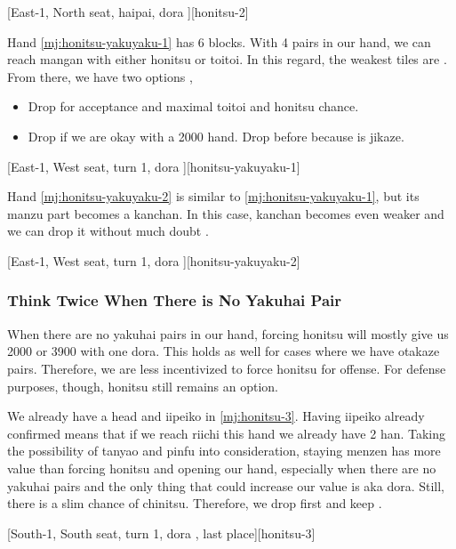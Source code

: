 \documentclass[12pt]{article}
\begin{document}
[East-1, North seat, haipai, dora ][honitsu-2]

Hand \ref{mj:honitsu-yakuyaku-1} has 6 blocks. With 4 pairs in our hand, we can reach mangan with either honitsu or toitoi. In this regard, the weakest tiles are . From there, we have two options \citep[][pp.~98--103]{tetsusenryaku},

\begin{itemize}
\item Drop  for  acceptance and maximal toitoi and honitsu chance.
\item Drop  if we are okay with a 2000 hand. Drop  before  because  is jikaze.
\end{itemize}

[East-1, West seat, turn 1, dora ][honitsu-yakuyaku-1]

Hand \ref{mj:honitsu-yakuyaku-2} is similar to \ref{mj:honitsu-yakuyaku-1}, but its manzu part becomes a kanchan. In this case,  kanchan becomes even weaker and we can drop it without much doubt \citep[][pp.~98--103]{tetsusenryaku}.

[East-1, West seat, turn 1, dora ][honitsu-yakuyaku-2]


\subsubsection*{Think Twice When There is No Yakuhai Pair}

When there are no yakuhai pairs in our hand, forcing honitsu will mostly give us 2000 or 3900 with one dora. This holds as well for cases where we have otakaze pairs. Therefore, we are less incentivized to force honitsu for offense. For defense purposes, though, honitsu still remains an option.

We already have a head and iipeiko in \ref{mj:honitsu-3}. Having iipeiko already confirmed means that if we reach riichi this hand we already have 2 han. Taking the possibility of tanyao and pinfu into consideration, staying menzen has more value than forcing honitsu and opening our hand, especially when there are no yakuhai pairs and the only thing that could increase our value is aka dora. Still, there is a slim chance of chinitsu. Therefore, we drop  first and keep  \citep{shibukawa-honitsu}.

[South-1, South seat, turn 1, dora , last place][honitsu-3]
\end{document}
